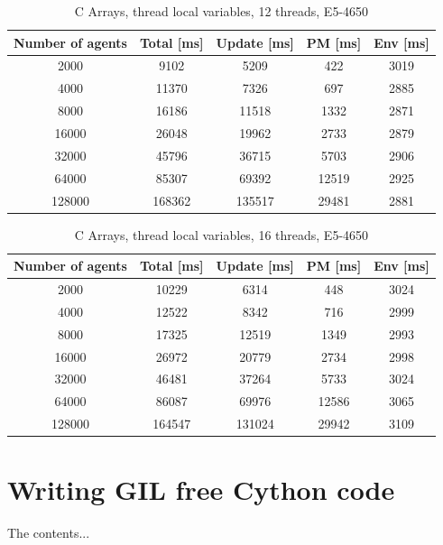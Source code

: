 \documentclass[12pt, a4paper]{report}
\begin{document}
\begin{appendices}
\begin{table}[H]
  \begin{center}
    \begin{tabular}{|c||c||c|c|c|}
    \hline
    Number of agents & Total [ms] & Update [ms] & PM [ms] & Env [ms] \\ \hline
    2000             & 9102       & 5209        & 422     & 3019     \\
    4000             & 11370      & 7326        & 697     & 2885     \\
    8000             & 16186      & 11518       & 1332    & 2871     \\
    16000            & 26048      & 19962       & 2733    & 2879     \\
    32000            & 45796      & 36715       & 5703    & 2906     \\
    64000            & 85307      & 69392       & 12519   & 2925     \\
    128000           & 168362     & 135517      & 29481   & 2881     \\ \hline
    \end{tabular}
    \caption {C Arrays, thread local variables, 12 threads, E5-4650}
    \label{table:append-c-arrays-12-thread-potoo}
  \end{center}
\end{table}

\begin{table}[H]
  \begin{center}
    \begin{tabular}{|c||c||c|c|c|}
    \hline
    Number of agents & Total [ms] & Update [ms] & PM [ms] & Env [ms] \\ \hline
    2000             & 10229      & 6314        & 448     & 3024     \\
    4000             & 12522      & 8342        & 716     & 2999     \\
    8000             & 17325      & 12519       & 1349    & 2993     \\
    16000            & 26972      & 20779       & 2734    & 2998     \\
    32000            & 46481      & 37264       & 5733    & 3024     \\
    64000            & 86087      & 69976       & 12586   & 3065     \\
    128000           & 164547     & 131024      & 29942   & 3109     \\ \hline
    \end{tabular}
    \caption {C Arrays, thread local variables, 16 threads, E5-4650}
    \label{table:append-c-arrays-16-thread-potoo}
  \end{center}
\end{table}

\chapter{Writing GIL free Cython code}
The contents...
\end{appendices}
\end{document}
